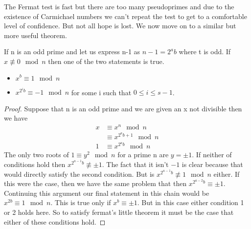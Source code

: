 \documentclass{article}
\begin{document}
The Fermat test is fast but there are too many pseudoprimes and due to the existence of Carmichael numbers we can't repeat the test to get to a comfortable level of confidence.  But not all hope is lost. We now move on to a similar but more useful theorem. 
\begin{theorem}
\label{strongpseudo}
If n is an odd prime and let us express n-1 as $n - 1 = 2^a b$ where t is odd. If $ x \not \equiv 0 \mod n$ then one of the two statements is true.
    \begin{itemize}
        \item $x^b \equiv 1 \mod n$ 
        \item $x^{2^i b} \equiv -1 \mod n$ for some i such that $0 \leq i \leq s -1$.
    \end{itemize}
\end{theorem}
\begin{proof}
Suppose that n is an odd prime and we are given an x not divisible then we have
\begin{align*}
    x &\equiv x^n \mod n \\
    &\equiv x^{2^a b + 1} \mod n \\
    1 &\equiv x^{2^a b} \mod n
\end{align*}
The only two roots of $1 \equiv y^2 \mod n$ for a prime n are $y = \pm 1$. If neither of conditions hold then $x^{2^{a-1} b} \not \equiv \pm 1$. The fact that it isn't $-1 $ is clear because that would directly satisfy the second condition. But is $x^{2^{a-1} b} \not \equiv 1 \mod n$ either. If this were the case, then we have the same problem that then $x^{2^{a-2} b} \equiv \pm 1$. Continuing this argument our final statement in this chain would be $x^{2 b} \equiv 1 \mod n$. This is true only if $x^b \equiv \pm 1$. But in this case either condition 1 or 2 holds here. So to satisfy fermat's little theorem it must be the case that either of these conditions hold. 
\end{proof}
\end{document}
